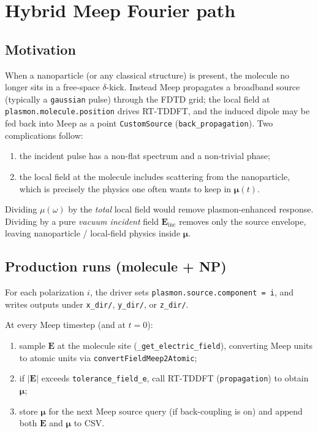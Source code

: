 \documentclass[11pt,a4paper]{article}
\begin{document}
\section{Hybrid Meep Fourier path}
\label{sec:hybrid}

\subsection{Motivation}

When a nanoparticle (or any classical structure) is present, the molecule no
longer sits in a free-space $\delta$-kick.  Instead Meep propagates a broadband
source (typically a \texttt{gaussian} pulse) through the FDTD grid; the local
field at \texttt{plasmon.molecule.position} drives RT-TDDFT, and the induced
dipole may be fed back into Meep as a point \texttt{CustomSource}
(\texttt{back\_propagation}).  Two complications follow:
\begin{enumerate}
  \item the incident pulse has a non-flat spectrum and a non-trivial phase;
  \item the local field at the molecule includes scattering from the
        nanoparticle, which is precisely the physics one often wants to
        keep in $\boldsymbol{\mu}(t)$.
\end{enumerate}
Dividing $\mu(\omega)$ by the \emph{total} local field would remove
plasmon-enhanced response.  Dividing by a pure \emph{vacuum incident} field
$\mathbf{E}_{\mathrm{inc}}$ removes only the source envelope, leaving
nanoparticle / local-field physics inside $\boldsymbol{\mu}$.

\subsection{Production runs (molecule + NP)}

For each polarization $i$, the driver sets \texttt{plasmon.source.component = i}, 
and writes outputs under \texttt{x\_dir/}, \texttt{y\_dir/}, or \texttt{z\_dir/}.  

\noindent At every Meep timestep (and at $t=0$):
\begin{enumerate}
  \item sample $\mathbf{E}$ at the molecule site
        (\texttt{\_get\_electric\_field}), converting Meep units to atomic
        units via \texttt{convertFieldMeep2Atomic};
  \item if $|\mathbf{E}|$ exceeds \texttt{tolerance\_field\_e}, call
        RT-TDDFT (\texttt{propagation}) to obtain $\boldsymbol{\mu}$;
  \item store $\boldsymbol{\mu}$ for the next Meep source query (if
        back-coupling is on) and append both $\mathbf{E}$ and
        $\boldsymbol{\mu}$ to CSV.
\end{enumerate}
\end{document}
